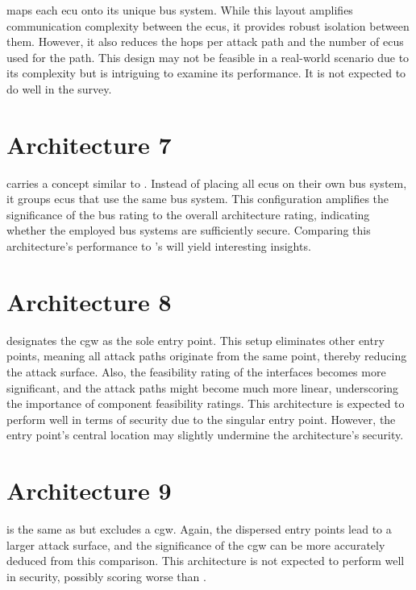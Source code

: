  maps each \acrshort{ecu} onto its unique bus system. 
While this layout amplifies communication complexity between the \acrshort{ecu}s, it provides robust isolation between them. 
However, it also reduces the hops per attack path and the number of \acrshort{ecu}s used for the path. 
This design may not be feasible in a real-world scenario due to its complexity but is intriguing to examine its performance. 
It is not expected to do well in the survey.

\section{Architecture 7}
\label{subsec:arch7}

 carries a concept similar to . 
Instead of placing all \acrshort{ecu}s on their own bus system, it groups \acrshort{ecu}s that use the same bus system.
This configuration amplifies the significance of the bus rating to the overall architecture rating, 
indicating whether the employed bus systems are sufficiently secure. 
Comparing this architecture's performance to 's will yield interesting insights.
\section{Architecture 8}
\label{subsec:arch8}

 designates the \acrshort{cgw} as the sole entry point. 
This setup eliminates other entry points, meaning all attack paths originate from the same point, thereby reducing the attack surface. 
Also, the feasibility rating of the interfaces becomes more significant, 
and the attack paths might become much more linear, underscoring the importance of component feasibility ratings. 
This architecture is expected to perform well in terms of security due to the singular entry point. 
However, the entry point's central location may slightly undermine the architecture's security.

\section{Architecture 9}
\label{subsec:arch9}

 is the same as  but excludes a \acrshort{cgw}. 
Again, the dispersed entry points lead to a larger attack surface, and the significance of the \acrshort{cgw} 
can be more accurately deduced from this comparison. 
This architecture is not expected to perform well in security, possibly scoring worse than .
